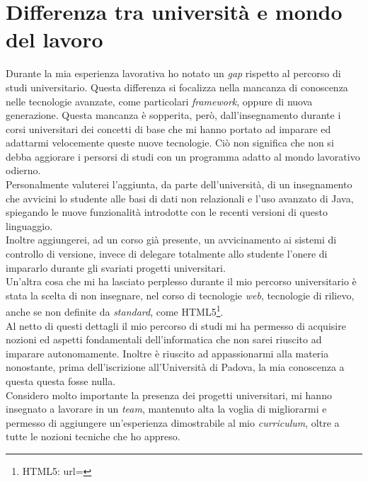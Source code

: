 \section{Differenza tra università e mondo del lavoro}
Durante la mia esperienza lavorativa ho notato un \textit{gap} rispetto al percorso di studi universitario. Questa differenza si focalizza nella mancanza di conoscenza nelle tecnologie avanzate, come particolari \textit{\gls{framework}}, oppure di nuova generazione. Questa mancanza è sopperita, però, dall'insegnamento durante i corsi universitari dei concetti di base che mi hanno portato ad imparare ed adattarmi velocemente queste nuove tecnologie. Ciò non significa che non si debba aggiorare i persorsi di studi con un programma adatto al mondo lavorativo odierno.\\ Personalmente valuterei l'aggiunta, da parte dell'università, di un insegnamento che avvicini lo studente alle basi di dati non relazionali e l'uso avanzato di Java, spiegando le nuove funzionalità introdotte con le recenti versioni di questo linguaggio.\\
Inoltre aggiungerei, ad un corso già presente, un avvicinamento ai sistemi di controllo di versione, invece di delegare totalmente allo studente l'onere di impararlo durante gli svariati progetti universitari.\\
Un'altra cosa che mi ha lasciato perplesso durante il mio percorso universitario è stata la scelta di non insegnare, nel corso di tecnologie \textit{web}, tecnologie di rilievo, anche se non definite da \textit{standard}, come HTML5\footnote{HTML5: url= }.\\
Al netto di questi dettagli il mio percorso di studi mi ha permesso di acquisire nozioni ed aspetti fondamentali dell'informatica che non sarei riuscito ad imparare autonomamente. Inoltre è riuscito ad appassionarmi alla materia nonostante, prima dell'iscrizione all'Università di Padova, la mia conoscenza a questa questa fosse nulla. \\Considero molto importante la presenza dei progetti universitari, mi hanno insegnato a lavorare in un \textit{team}, mantenuto alta la voglia di migliorarmi e permesso di aggiungere un'esperienza dimostrabile al mio \textit{curriculum}, oltre a tutte le nozioni tecniche che ho appreso.


